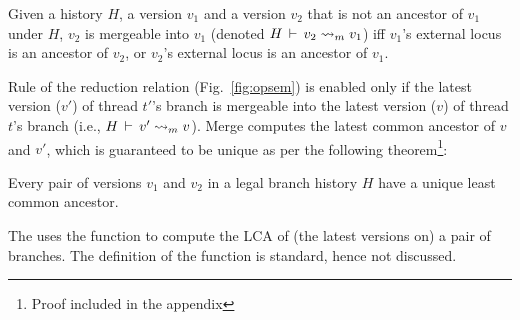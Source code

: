 \begin{definition} 
Given a history $H$, a version $v_1$ and a version $v_2$ that is not
an ancestor of $v_1$ under $H$, $v_2$ is mergeable into $v_1$ (denoted
$H\,\vdash\,v_2 \rightsquigarrow_m v_1$) iff $v_1$'s external locus is an
ancestor of $v_2$, or $v_2$'s external locus is an ancestor of $v_1$.
\end{definition}

Rule  of the reduction relation
(Fig.~\ref{fig:opsem}) is enabled only if the latest version ($v'$)
of thread $t'$'s branch is mergeable into the latest version ($v$) of
thread $t$'s branch (i.e., $H\,\vdash\,v' \rightsquigarrow_m v$). Merge computes
the latest common ancestor of $v$ and $v'$, which is 
guaranteed to be unique as per the following theorem\footnote{Proof
included in the appendix}:

\begin{theorem} 
Every pair of versions $v_1$ and $v_2$ in a legal branch history $H$ 
have a unique least common ancestor. 
\end{theorem}

The  uses the function  to compute the
LCA of (the latest versions on) a pair of branches. The definition of
the function is standard, hence not discussed.
